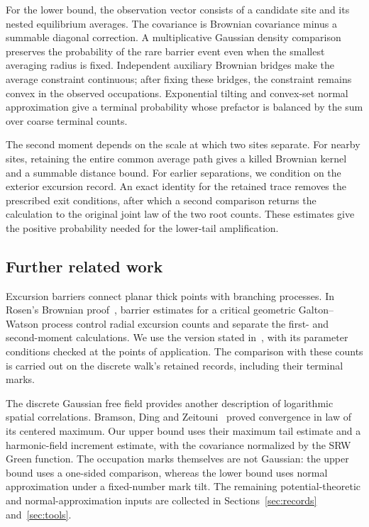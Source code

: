 \documentclass[11pt,a4paper]{article}
\numberwithin{equation}{section}
\theoremstyle{remark}
\begin{document}
For the lower bound, the observation vector consists of a candidate site and its nested equilibrium averages. The covariance is Brownian covariance minus a summable diagonal correction. A multiplicative Gaussian density comparison preserves the probability of the rare barrier event even when the smallest averaging radius is fixed. Independent auxiliary Brownian bridges make the average constraint continuous; after fixing these bridges, the constraint remains convex in the observed occupations. Exponential tilting and convex-set normal approximation give a terminal probability whose prefactor is balanced by the sum over coarse terminal counts.

The second moment depends on the scale at which two sites separate. For nearby sites, retaining the entire common average path gives a killed Brownian kernel and a summable distance bound. For earlier separations, we condition on the exterior excursion record. An exact identity for the retained trace removes the prescribed exit conditions, after which a second comparison returns the calculation to the original joint law of the two root counts. These estimates give the positive probability needed for the lower-tail amplification.

\subsection{Further related work}\label{sec:related}
Excursion barriers connect planar thick points with branching processes. In Rosen's Brownian proof~\cite{GW}, barrier estimates for a critical geometric Galton--Watson process control radial excursion counts and separate the first- and second-moment calculations. We use the version stated in~\cite[Theorem 9.1]{GW}, with its parameter conditions checked at the points of application. The comparison with these counts is carried out on the discrete walk's retained records, including their terminal marks.

The discrete Gaussian free field provides another description of logarithmic spatial correlations. Bramson, Ding and Zeitouni~\cite{BDZ} proved convergence in law of its centered maximum. Our upper bound uses their maximum tail estimate and a harmonic-field increment estimate, with the covariance normalized by the SRW Green function. The occupation marks themselves are not Gaussian: the upper bound uses a one-sided comparison, whereas the lower bound uses normal approximation under a fixed-number mark tilt. The remaining potential-theoretic and normal-approximation inputs are collected in Sections~\ref{sec:records} and~\ref{sec:tools}.
\end{document}
